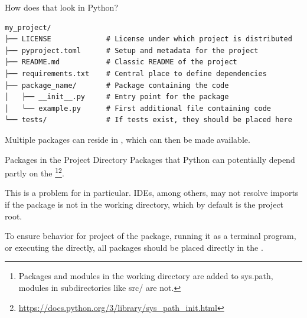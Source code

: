 \documentclass[12pt, aspectratio=169, usepdftitle=false]{beamer}
\newcommand{\pp}[1]{\lpl{#1}}
\newcommand{\furl}[1]{\footnote{\url{#1}}}
\begin{document}
\begin{frame}[fragile]{How does that look in Python?}
\begin{verbatim}
my_project/
├── LICENSE             # License under which project is distributed
├── pyproject.toml      # Setup and metadata for the project
├── README.md           # Classic README of the project
├── requirements.txt    # Central place to define dependencies
├── package_name/       # Package containing the code
│   ├── __init__.py     # Entry point for the package
│   └── example.py      # First additional file containing code
└── tests/              # If tests exist, they should be placed here 
\end{verbatim}

\medskip

Multiple packages can reside in , which can then be made available.


\end{frame}



\begin{frame}{Packages in the Project Directory}
	Packages that Python can potentially  depend partly on the \footnote{Packages and modules in the working directory are added to sys.path, modules in subdirectories like src/ are not.}\furl{https://docs.python.org/3/library/sys_path_init.html}.
	
	\medskip
	
	This is a problem for  in particular.\newline
	\pause
	IDEs, among others, may not resolve imports if the package is not in the working directory, which by default is the project root.
	
	\medskip
	\pause
	
	To ensure  behavior for  project  
	of the package, 
	\pause 
	running it as a terminal program, 
	\pause
	or executing the \pp{__init__.py} directly, 
	\pause
	all  packages should be placed directly in the .
\end{frame}
\end{document}
